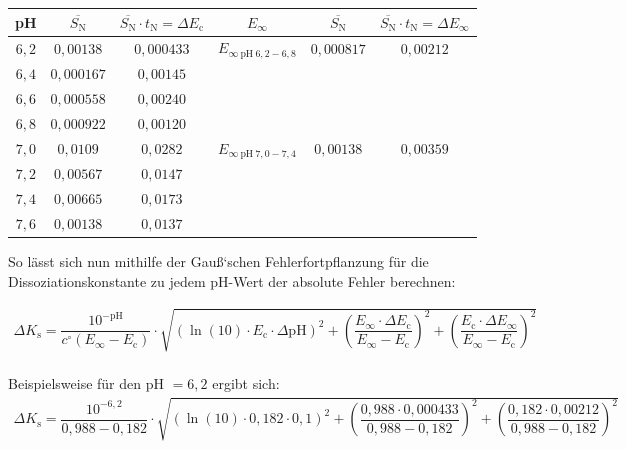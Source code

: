 \documentclass[12pt,a4paper,titlepage,headinclude,bibtotoc]{scrartcl}
\begin{document}
\begin{table} [h]
\centering
\begin{tabular} {|c|c|c||c|c|c|}
  \hline
  pH & $\overline{S_\mathrm{N}}$ & $\overline{S_\mathrm{N}} \cdot t_{\mathrm{N}} = \Delta E_{\mathrm{c}} $ & $E_{\infty}$ & $\overline{S_\mathrm{N}}$ & $\overline{S_\mathrm{N}} \cdot t_{\mathrm{N}} = \Delta E_{\infty} $ \\\hline\hline
  $6,2$ & $0,00138$& $0,000433$&$E_{\infty {~}\mathrm{pH}{~} 6,2-6,8}$ &$0,000817$ & $0,00212$\\
  $6,4$& $0,000167$& $0,00145$&&& \\
  $6,6$& $0,000558$& $0,00240$&&&\\
  $6,8$& $0,000922$&$0,00120$&&&\\\hline\hline
  $7,0$& $0,0109$& $0,0282$ &$E_{\infty {~}\mathrm{pH}{~} 7,0-7,4}$&$0,00138$& $0,00359$\\
  $7,2$& $0,00567$& $0,0147$&&&\\
  $7,4$& $0,00665$&$0,0173$&&&\\
  $7,6$& $0,00138$&$0,0137$&&&\\\hline
  
 \end{tabular}
\end{table}

So lässt sich nun mithilfe der Gauß`schen Fehlerfortpflanzung für die Dissoziationskonstante zu jedem pH-Wert der absolute Fehler berechnen:

\begin{align}
\Delta K_{\mathrm{s}} = \dfrac{10^{\mathrm{-pH}}}{c^{\circ}(E_{\infty}-E_{\mathrm{c}})} \cdot \sqrt{(\ln (10) \cdot E_{\mathrm{c}} \cdot \Delta \mathrm{pH})^2 + \left(\dfrac{E_{\infty} \cdot \Delta E_{\mathrm{c}}}{E_{\infty}-E_{\mathrm{c}}}\right)^2 + \left(\dfrac{E_{\mathrm{c}} \cdot \Delta E_{\infty}}{E_{\infty}-E_{\mathrm{c}} }\right)^2}
\end{align}
\\
Beispielsweise für den pH $= 6,2$ ergibt sich:\\
\begin{align*}
\Delta K_{\mathrm{s}} = \dfrac{10^{\mathrm{-6,2}}}{0,988-0,182} \cdot \sqrt{(\ln (10) \cdot 0,182 \cdot 0,1)^2 + \left(\dfrac{0,988 \cdot 0,000433 }{0,988-0,182}\right)^2 + \left(\dfrac{0,182 \cdot 0,00212 }{0,988-0,182}\right)^2}
\end{align*}
\vspace{3cm}
\end{document}
